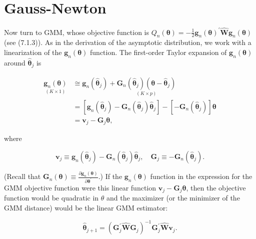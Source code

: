 \documentclass[10pt]{article}
\begin{document}
\section*{Gauss-Newton}
Now turn to GMM, whose objective function is $Q_{n}(\boldsymbol{\theta})=-\frac{1}{2} \mathbf{g}_{n}(\boldsymbol{\theta})^{\prime} \widehat{\mathbf{W}} \mathbf{g}_{n}(\boldsymbol{\theta})$ (see (7.1.3)). As in the derivation of the asymptotic distribution, we work with a linearization of the $\mathbf{g}_{n}(\boldsymbol{\theta})$ function. The first-order Taylor expansion of $\mathbf{g}_{n}(\boldsymbol{\theta})$ around $\hat{\boldsymbol{\theta}}_{j}$ is


\begin{align*}
\underset{(K \times 1)}{\mathbf{g}_{n}(\boldsymbol{\theta})} & \cong \mathbf{g}_{n}\left(\hat{\boldsymbol{\theta}}_{j}\right)+\underset{(K \times p)}{\mathbf{G}_{n}\left(\hat{\boldsymbol{\theta}}_{j}\right)\left(\boldsymbol{\theta}-\hat{\boldsymbol{\theta}}_{j}\right)} \\
& =\left[\mathbf{g}_{n}\left(\hat{\boldsymbol{\theta}}_{j}\right)-\mathbf{G}_{n}\left(\hat{\boldsymbol{\theta}}_{j}\right) \hat{\boldsymbol{\theta}}_{j}\right]-\left[-\mathbf{G}_{n}\left(\hat{\boldsymbol{\theta}}_{j}\right)\right] \boldsymbol{\theta} \\
& =\mathbf{v}_{j}-\mathbf{G}_{j} \boldsymbol{\theta}, \tag{7.5.4}
\end{align*}


where


\begin{equation*}
\mathbf{v}_{j} \equiv \mathbf{g}_{n}\left(\hat{\boldsymbol{\theta}}_{j}\right)-\mathbf{G}_{n}\left(\hat{\boldsymbol{\theta}}_{j}\right) \hat{\boldsymbol{\theta}}_{j}, \quad \mathbf{G}_{j} \equiv-\mathbf{G}_{n}\left(\hat{\boldsymbol{\theta}}_{j}\right) . \tag{7.5.5}
\end{equation*}


(Recall that $\mathbf{G}_{n}(\boldsymbol{\theta}) \equiv \frac{\partial \mathbf{g}_{n}(\boldsymbol{\theta})}{\partial \boldsymbol{\theta}^{\prime}}$.) If the $\mathbf{g}_{n}(\boldsymbol{\theta})$ function in the expression for the GMM objective function were this linear function $\mathbf{v}_{j}-\mathbf{G}_{j} \boldsymbol{\theta}$, then the objective function would be quadratic in $\theta$ and the maximizer (or the minimizer of the GMM distance) would be the linear GMM estimator:


\begin{equation*}
\hat{\boldsymbol{\theta}}_{j+1}=\left(\mathbf{G}_{j}^{\prime} \widehat{\mathbf{W}} \mathbf{G}_{j}\right)^{-1} \mathbf{G}_{j}^{\prime} \widehat{\mathbf{W}} \mathbf{v}_{j} . \tag{7.5.6}
\end{equation*}
\end{document}
